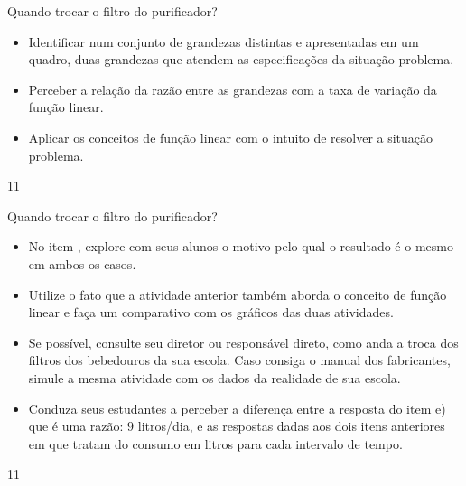 \clearpage
\def\currentcolor{session2}
\begin{objectives}{Quando trocar o filtro do purificador?}
{
\begin{itemize}
\item Identificar num conjunto de grandezas distintas e apresentadas em um quadro, duas grandezas que atendem as especificações da situação problema.
\item Perceber a relação da razão entre as grandezas com a taxa de variação da função linear.
\item Aplicar os conceitos de função linear com o intuito de resolver a situação problema.
\end{itemize}
}{1}{1}
\end{objectives}
\begin{sugestions}{Quando trocar o filtro do purificador?}
{
\begin{itemize}
\item No item , explore com seus alunos o motivo pelo qual o resultado é o mesmo em ambos os casos.
\item Utilize o fato que a atividade anterior também aborda o conceito de função linear e faça um comparativo com os gráficos das duas atividades.
\item Se possível, consulte seu diretor ou responsável direto, como anda a troca dos filtros dos bebedouros da sua escola. Caso consiga o manual dos fabricantes, simule a mesma atividade com os dados da realidade de sua escola.
\item Conduza seus estudantes a perceber a diferença entre a resposta do item e) que é uma razão: $9$ litros/dia, e as respostas dadas aos dois itens anteriores em que tratam do consumo em litros para cada intervalo de tempo.
\end{itemize}
}{1}{1}
\end{sugestions}
\clearmargin

